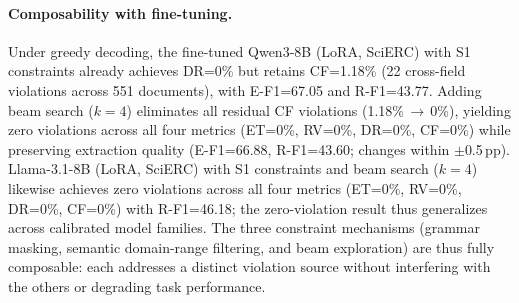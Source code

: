 \begin{table}[h]
\centering
\small
\caption{Beam width sweep on SciERC (Qwen3-8B LoRA, 551 documents). \textsc{unc}: unconstrained; \textsc{con}: schema-constrained. Latency relative to $k{=}1$ unconstrained. Highlighted row: Pareto-optimal configuration.}
\label{tab:beam-sweep}
\end{table}

\paragraph{Composability with fine-tuning.}
Under greedy decoding, the fine-tuned Qwen3-8B (LoRA, SciERC) with S1 constraints already achieves DR=0\% but retains CF=1.18\% (22 cross-field violations across 551 documents), with E-F1=67.05 and R-F1=43.77.
Adding beam search ($k{=}4$) eliminates all residual CF violations (1.18\%\,$\to$\,0\%), yielding zero violations across all four metrics (ET=0\%, RV=0\%, DR=0\%, CF=0\%) while preserving extraction quality (E-F1=66.88, R-F1=43.60; changes within $\pm$0.5\,pp).
Llama-3.1-8B (LoRA, SciERC) with S1 constraints and beam search ($k{=}4$) likewise achieves zero violations across all four metrics (ET=0\%, RV=0\%, DR=0\%, CF=0\%) with R-F1=46.18; the zero-violation result thus generalizes across calibrated model families.
The three constraint mechanisms (grammar masking, semantic domain-range filtering, and beam exploration) are thus fully composable: each addresses a distinct violation source without interfering with the others or degrading task performance.

